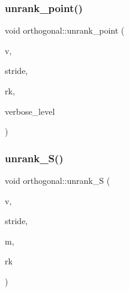 \subsubsection{\texorpdfstring{unrank\+\_\+point()}{unrank\_point()}}
{\footnotesize\ttfamily void orthogonal\+::unrank\+\_\+point (\begin{DoxyParamCaption}\item[{\mbox{\hyperlink{galois_8h_a09fddde158a3a20bd2dcadb609de11dc}{I\+NT}} $\ast$}]{v,  }\item[{\mbox{\hyperlink{galois_8h_a09fddde158a3a20bd2dcadb609de11dc}{I\+NT}}}]{stride,  }\item[{\mbox{\hyperlink{galois_8h_a09fddde158a3a20bd2dcadb609de11dc}{I\+NT}}}]{rk,  }\item[{\mbox{\hyperlink{galois_8h_a09fddde158a3a20bd2dcadb609de11dc}{I\+NT}}}]{verbose\+\_\+level }\end{DoxyParamCaption})}

\mbox{\label{classorthogonal_a6c1a290c3bdaef0d20ca21d39a66544e}} 
\subsubsection{\texorpdfstring{unrank\+\_\+\+S()}{unrank\_S()}}
{\footnotesize\ttfamily void orthogonal\+::unrank\+\_\+S (\begin{DoxyParamCaption}\item[{\mbox{\hyperlink{galois_8h_a09fddde158a3a20bd2dcadb609de11dc}{I\+NT}} $\ast$}]{v,  }\item[{\mbox{\hyperlink{galois_8h_a09fddde158a3a20bd2dcadb609de11dc}{I\+NT}}}]{stride,  }\item[{\mbox{\hyperlink{galois_8h_a09fddde158a3a20bd2dcadb609de11dc}{I\+NT}}}]{m,  }\item[{\mbox{\hyperlink{galois_8h_a09fddde158a3a20bd2dcadb609de11dc}{I\+NT}}}]{rk }\end{DoxyParamCaption})}

\mbox{\label{classorthogonal_af5dc4e991f79be6bfdce4325648e037a}} 
